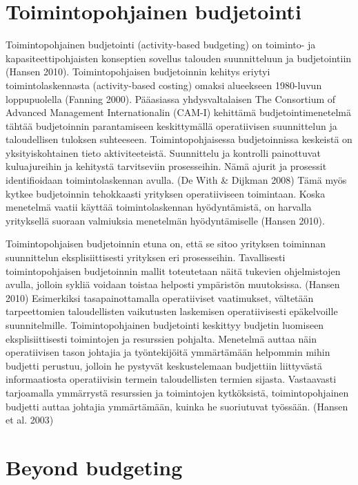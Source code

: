 \documentclass[12pt,a4paper,oneside,pdftex]{report}
\begin{document}
\section{Toimintopohjainen budjetointi}

Toimintopohjainen budjetointi (activity-based budgeting) on toiminto- ja kapasiteettipohjaisten konseptien sovellus talouden suunnitteluun ja budjetointiin (Hansen 2010). Toimintopohjaisen budjetoinnin kehitys eriytyi toimintolaskennasta (activity-based costing) omaksi alueekseen 1980-luvun loppupuolella (Fanning 2000). Pääasiassa yhdysvaltalaisen The Consortium of Advanced Management Internationalin (CAM-I) kehittämä budjetointimenetelmä tähtää budjetoinnin parantamiseen keskittymällä operatiivisen suunnittelun ja taloudellisen tuloksen suhteeseen. Toimintopohjaisessa budjetoinnissa keskeistä on yksityiskohtainen tieto aktiviteeteistä. Suunnittelu ja kontrolli painottuvat kuluajureihin ja kehitystä tarvitseviin prosesseihin. Nämä ajurit ja prosessit identifioidaan toimintolaskennan avulla. (De With & Dijkman 2008) Tämä myös kytkee budjetoinnin tehokkaasti yrityksen operatiiviseen toimintaan. Koska menetelmä vaatii käyttää toimintolaskennan hyödyntämistä, on harvalla yrityksellä suoraan valmiuksia menetelmän hyödyntämiselle (Hansen 2010).

Toimintopohjaisen budjetoinnin etuna on, että se sitoo yrityksen toiminnan suunnittelun eksplisiittisesti yrityksen eri prosesseihin. Tavallisesti toimintopohjaisen budjetoinnin mallit toteutetaan näitä tukevien ohjelmistojen avulla, jolloin sykliä voidaan toistaa helposti ympäristön muutoksissa. (Hansen 2010) Esimerkiksi tasapainottamalla operatiiviset vaatimukset, vältetään tarpeettomien taloudellisten vaikutusten laskemisen operatiivisesti epäkelvoille suunnitelmille. Toimintopohjainen budjetointi keskittyy budjetin luomiseen eksplisiittisesti toimintojen ja resurssien pohjalta. Menetelmä auttaa näin operatiivisen tason johtajia ja työntekijöitä ymmärtämään helpommin mihin budjetti perustuu, jolloin he pystyvät keskustelemaan budjettiin liittyvästä informaatiosta operatiivisin termein taloudellisten termien sijasta. Vastaavasti tarjoamalla ymmärrystä resurssien ja toimintojen kytköksistä, toimintopohjainen budjetti auttaa johtajia ymmärtämään, kuinka he suoriutuvat työssään. (Hansen et al. 2003)

\section{Beyond budgeting}
\end{document}
